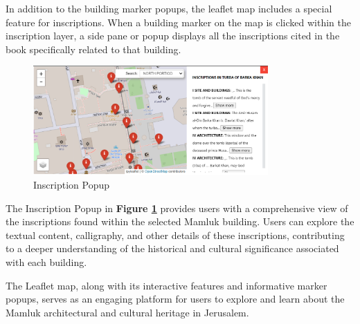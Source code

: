 In addition to the building marker popups, the leaflet map includes a special feature for inscriptions. When a building marker on the map is clicked within the inscription layer, a side pane or popup displays all the inscriptions cited in the book specifically related to that building.

\begin{figure}[H]
\centering
\includegraphics[width=0.8\textwidth]{Images/insc_popup.png}
\caption{Inscription Popup}
\label{fig:inscription_popup}
\end{figure}

The Inscription Popup in \textbf{Figure \ref{fig:inscription_popup}} provides users with a comprehensive view of the inscriptions found within the selected Mamluk building. Users can explore the textual content, calligraphy, and other details of these inscriptions, contributing to a deeper understanding of the historical and cultural significance associated with each building.

The Leaflet map, along with its interactive features and informative marker popups, serves as an engaging platform for users to explore and learn about the Mamluk architectural and cultural heritage in Jerusalem.


